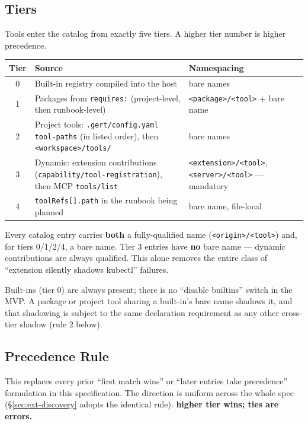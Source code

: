 \subsection{Tiers}
\label{sec:tool-tiers}

Tools enter the catalog from exactly five tiers. A higher tier number is
higher precedence.

\begin{center}
\begin{tabular}{cp{6.2cm}p{4.8cm}}
\hline
\textbf{Tier} & \textbf{Source} & \textbf{Namespacing} \\
\hline
0 & Built-in registry compiled into the host & bare names \\
1 & Packages from \texttt{requires:} (project-level, then runbook-level) & \texttt{<package>/<tool>} + bare name \\
2 & Project tools: \texttt{.gert/config.yaml} \texttt{tool-paths} (in listed order), then \texttt{<workspace>/tools/} & bare names \\
3 & Dynamic: extension contributions (\texttt{capability/tool-registration}), then MCP \texttt{tools/list} & \texttt{<extension>/<tool>}, \texttt{<server>/<tool>} --- mandatory \\
4 & \texttt{toolRefs[].path} in the runbook being planned & bare name, file-local \\
\hline
\end{tabular}
\end{center}

Every catalog entry carries \textbf{both} a fully-qualified name
(\texttt{<origin>/<tool>}) and, for tiers 0/1/2/4, a bare name. Tier 3
entries have \textbf{no} bare name --- dynamic contributions are always
qualified. This alone removes the entire class of ``extension silently
shadows kubectl'' failures.

Built-ins (tier 0) are always present; there is no ``disable builtins''
switch in the MVP. A package or project tool sharing a built-in's bare name
shadows it, and that shadowing is subject to the same declaration
requirement as any other cross-tier shadow (rule 2 below).

\subsection{Precedence Rule}
\label{sec:tool-precedence}

This replaces every prior ``first match wins'' or ``later entries take
precedence'' formulation in this specification. The direction is uniform
across the whole spec (\S\ref{sec:ext-discovery} adopts the identical rule):
\textbf{higher tier wins; ties are errors.}

